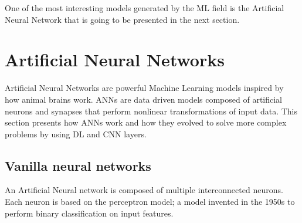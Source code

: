 \documentclass[../main.tex]{subfiles}
\begin{document}
One of the most interesting models generated by the ML field is the Artificial Neural Network that is going to be presented in the next section.

\section{Artificial Neural Networks}
\label{ANN}

Artificial Neural Networks are powerful Machine Learning models inspired by how animal brains work.
ANNs are data driven models composed of artificial neurons and synapses that perform nonlinear transformations of input data.
This section presents how ANNs work and how they evolved to solve more complex problems by using DL and CNN layers.

\subsection{Vanilla neural networks}
An Artificial Neural network is composed of multiple interconnected neurons. Each neuron is based on the perceptron model; a model invented in the 1950s to perform binary classification on input features.
\end{document}
